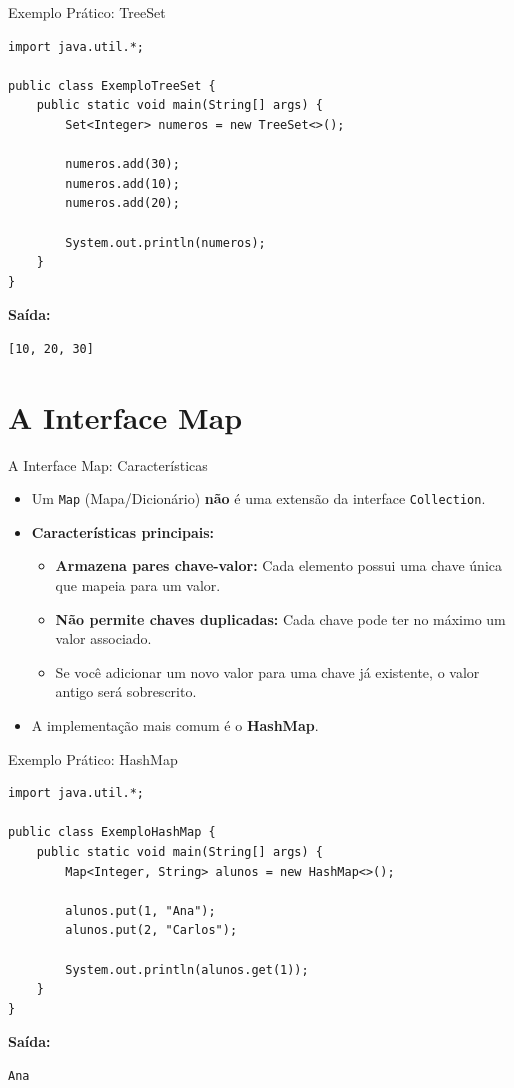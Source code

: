 \documentclass[9pt]{beamer}
\begin{document}
\begin{frame}[fragile]{Exemplo Prático: TreeSet}
    \begin{lstlisting}
import java.util.*;

public class ExemploTreeSet {
    public static void main(String[] args) {
        Set<Integer> numeros = new TreeSet<>();

        numeros.add(30);
        numeros.add(10);
        numeros.add(20);

        System.out.println(numeros);
    }
}
    \end{lstlisting}
    \textbf{Saída:}
    \begin{lstlisting}[numbers=none, backgroundcolor=\color{white}]
[10, 20, 30]
    \end{lstlisting}
\end{frame}

\section{A Interface Map}

\begin{frame}{A Interface Map: Características}
    \begin{itemize}
        \item Um \texttt{Map} (Mapa/Dicionário) \textbf{não} é uma extensão da interface \texttt{Collection}.
        \item \textbf{Características principais:}
        \begin{itemize}
            \item \textbf{Armazena pares chave-valor:} Cada elemento possui uma chave única que mapeia para um valor.
            \item \textbf{Não permite chaves duplicadas:} Cada chave pode ter no máximo um valor associado.
            \item Se você adicionar um novo valor para uma chave já existente, o valor antigo será sobrescrito.
        \end{itemize}
        \item A implementação mais comum é o \textbf{HashMap}.
    \end{itemize}
\end{frame}

\begin{frame}[fragile]{Exemplo Prático: HashMap}
    \begin{lstlisting}
import java.util.*;

public class ExemploHashMap {
    public static void main(String[] args) {
        Map<Integer, String> alunos = new HashMap<>();

        alunos.put(1, "Ana");
        alunos.put(2, "Carlos");

        System.out.println(alunos.get(1));
    }
}
    \end{lstlisting}
    \textbf{Saída:}
    \begin{lstlisting}[numbers=none, backgroundcolor=\color{white}]
Ana
    \end{lstlisting}
\end{frame}
\end{document}
